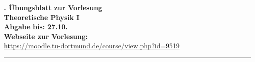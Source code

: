 \newenvironment{exercise}
[2]
{\addtocounter{exercise}{1}{\bfseries{Aufgabe \arabic{exercise}:~#1}\hfill(#2 Punkte)}\newline}
{\medskip}

\setlength{\parindent}{0mm}

{\large\bfseries \thesheet. Übungsblatt zur Vorlesung\hfill\thesemester}\\
{\large\bfseries Theoretische Physik I\hfill\theprofessor}\\
{\large\bfseries Abgabe bis: 27.10.}\\
\textbf{Webseite zur Vorlesung: \\}
\url{https://moodle.tu-dortmund.de/course/view.php?id=9519} \\
\rule{\columnwidth}{0.1ex}
\medskip
